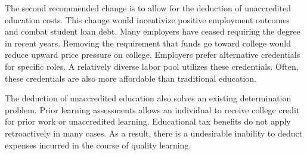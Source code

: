 \documentclass[review]{elsarticle}
\begin{document}


The second recommended change is to allow for the deduction of unaccredited education costs.
This change would incentivize positive employment outcomes and combat student loan debt.
Many employers have ceased requiring the degree in recent years.
Removing the requirement that funds go toward college would reduce upward price pressure on college.
Employers prefer alternative credentials for specific roles.
A relatively diverse labor pool utilizes these credentials.
Often, these credentials are also more affordable than traditional education.

The deduction of unaccredited education also solves an existing determination problem.
Prior learning assessments allows an individual to receive college credit for prior work or unaccredited learning.
Educational tax benefits do not apply retroactively in many cases.
As a result, there is a undesirable inability to deduct expenses incurred in the course of quality learning.

\end{document}
